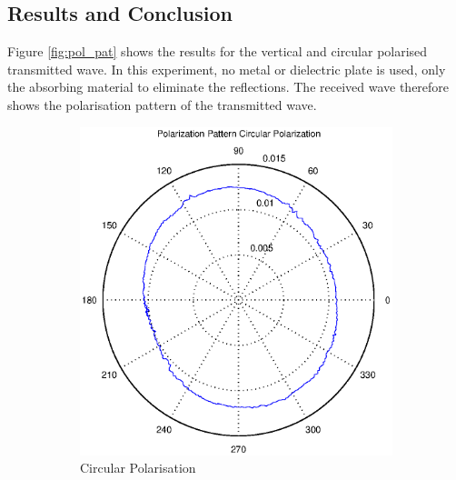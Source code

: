 \documentclass[11pt,a4paper]{article}
\begin{document}
\subsection{Results and Conclusion}
Figure \ref{fig:pol_pat} shows the results for the vertical and circular polarised transmitted wave. In this experiment, no metal or dielectric plate is used, only the absorbing material to eliminate the reflections. The received wave therefore shows the polarisation pattern of the transmitted wave. 

\begin{figure}[H]
\begin{subfigure}{0.5\textwidth}
  \centering
  \includegraphics[width=1.2\linewidth]{2_1circ_pol.eps}
  \caption{Circular Polarisation}
  \label{fig:2_1circ}
\end{subfigure}%
\begin{subfigure}{0.5\textwidth}
  \centering

\end{subfigure}
\end{figure}
\end{document}
